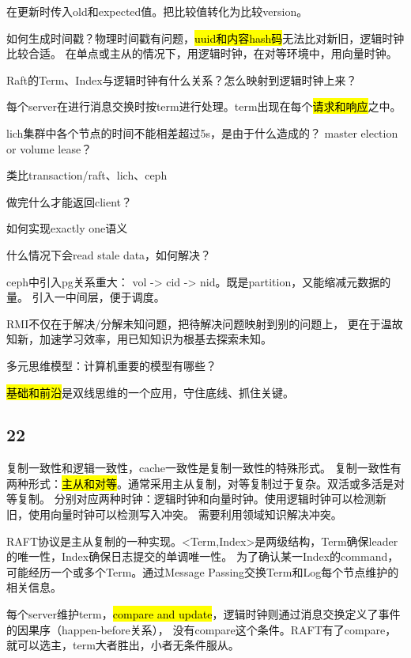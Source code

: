 在更新时传入old和expected值。把比较值转化为比较version。

如何生成时间戳？物理时间戳有问题，\hl{uuid和内容hash码}无法比对新旧，逻辑时钟比较合适。
在单点或主从的情况下，用逻辑时钟，在对等环境中，用向量时钟。

Raft的Term、Index与逻辑时钟有什么关系？怎么映射到逻辑时钟上来？

每个server在进行消息交换时按term进行处理。term出现在每个\hl{请求和响应}之中。

lich集群中各个节点的时间不能相差超过5s，是由于什么造成的？
master election or volume lease？

类比transaction/raft、lich、ceph
\begin{enumbox}
\item 做完什么才能返回client？
\item 如何实现exactly one语义
\item 什么情况下会read stale data，如何解决？
\end{enumbox}

ceph中引入pg关系重大： vol -> cid -> nid。既是partition，又能缩减元数据的量。
引入一中间层，便于调度。

RMI不仅在于解决/分解未知问题，把待解决问题映射到别的问题上，
更在于温故知新，加速学习效率，用已知知识为根基去探索未知。

\hrulefill

多元思维模型：计算机重要的模型有哪些？

\hl{基础和前沿}是双线思维的一个应用，守住底线、抓住关键。

\subsection{22}

复制一致性和逻辑一致性，cache一致性是复制一致性的特殊形式。
复制一致性有两种形式：\hl{主从和对等}。通常采用主从复制，对等复制过于复杂。双活或多活是对等复制。
分别对应两种时钟：逻辑时钟和向量时钟。使用逻辑时钟可以检测新旧，使用向量时钟可以检测写入冲突。
需要利用领域知识解决冲突。

RAFT协议是主从复制的一种实现。<Term,Index>是两级结构，Term确保leader的唯一性，Index确保日志提交的单调唯一性。
为了确认某一Index的command，可能经历一个或多个Term。通过Message Passing交换Term和Log每个节点维护的相关信息。

每个server维护term，\hl{compare and update}，逻辑时钟则通过消息交换定义了事件的因果序（happen-before关系），
没有compare这个条件。RAFT有了compare，就可以选主，term大者胜出，小者无条件服从。

